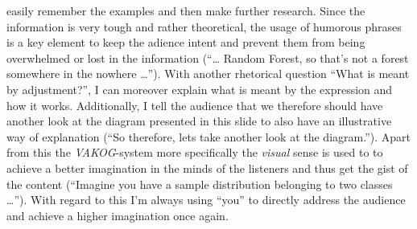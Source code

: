 easily remember the examples and then make further research. Since the information is very tough and rather theoretical, the usage of humorous phrases is a key element to keep the adience intent and prevent them from being overwhelmed or lost in the information (\enquote{\dots{} Random Forest, so that's not a forest somewhere in the nowhere \dots}). With another rhetorical question \enquote{What is meant by adjustment?}, I can moreover explain what is meant by the expression and how it works. Additionally, I tell the audience that we therefore should have another look at the diagram presented in this slide to also have an illustrative way of explanation (\enquote{So therefore, lets take another look at the diagram.}). Apart from this the \textit{VAKOG}-system more specifically the \textit{visual} sense is used to to achieve a better imagination in the minds of the listeners and thus get the gist of the content (\enquote{Imagine you have a sample distribution belonging to two classes \dots}). With regard to this I'm always using \enquote{you} to directly address the audience and achieve a higher imagination once again.